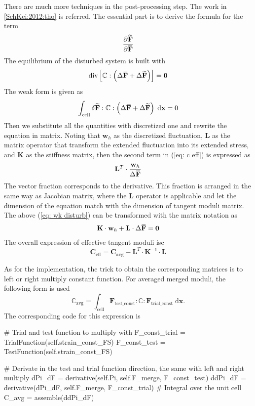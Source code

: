 \documentclass[10pt,a4paper]{scrreprt}
\newcommand{\myd}{\;\mathrm{d}}
\newcommand{\overbar}[1]{\mkern 1.5mu\overline{\mkern-1.5mu#1\mkern-1.5mu}\mkern 1.5mu}
\begin{document}
There are much more techniques in the post-processing step. The work in \ref{SchKei:2012:tho} is referred. The essential part is to derive the formula for the term 
\[
\dfrac{\partial \widetilde{\mathbf{F}}}{\partial \overbar{\mathbf{F}}}
\]
The equilibrium of the disturbed system is built with
\[
\text{div} \left[ \mathbb{C} : \left( \Delta \overbar{\mathbf{F}} + \Delta \widetilde{\mathbf{F}} \right) \right] = \mathbf{0}
\]
The weak form is given as
\begin{equation}
\label{eq: wk disturb}
\int_{\text{cell}} \delta \widetilde{\mathbf{F}} : \mathbb{C} : \left( \Delta \overbar{\mathbf{F}} + \Delta \widetilde{\mathbf{F}} \right) \myd{\mathbf{x}} = 0
\end{equation}
Then we substitute all the quantities with discretized one and rewrite the equation in matrix. Noting that $\mathbf{w}_{h}$ as the discretized fluctuation, $\mathbf{L}$ as the matrix operator that transform the extended fluctuation into its extended stress, and $\mathbf{K}$ as the stiffness matrix, then the second term in (\ref{eq: c eff}) is expressed as
\begin{equation}
\mathbf{L}^{T} \cdot \dfrac{\mathbf{w}_{h}}{\Delta \overbar{\mathbf{F}}} 
\end{equation}
The vector fraction corresponds to the derivative. This fraction is arranged in the same way as Jacobian matrix, where the $\mathbf{L}$ operator is applicable and let the dimension of the equation match with the dimension of tangent moduli matrix. The above (\ref{eq: wk disturb}) can be transformed with the matrix notation as
\begin{equation}
\mathbf{K} \cdot \mathbf{w}_{h} + \mathbf{L} \cdot \Delta \overbar{\mathbf{F}} = \mathbf{0}
\end{equation}
The overall expression of effective tangent moduli isc
\begin{equation}
\mathbf{C}_{\text{eff}} = \mathbf{C}_{\text{avg}} - \mathbf{L}^{T} \cdot \mathbf{K}^{-1} \cdot \mathbf{L}
\end{equation}

As for the implementation, the trick to obtain the corresponding matrices is to left or right multiply constant function. For averaged merged moduli, the following form is used
\begin{equation}
\mathbb{C}_{\text{avg}} = \int_{\text{cell}} \mathbf{F}_{\text{test\_const}}: \mathbb{C} : \mathbf{F}_{\text{trial\_const}} \myd{\mathbf{x}}.
\end{equation}
The corresponding code for this expression is 
\begin{python}
# Trial and test function to multiply with
F_const_trial = TrialFunction(self.strain_const_FS)
F_const_test = TestFunction(self.strain_const_FS)

# Derivate in the test and trial function direction, the same with left and right multiply
dPi_dF = derivative(self.Pi, self.F_merge, F_const_test)
ddPi_dF = derivative(dPi_dF, self.F_merge, F_const_trial)
# Integral over the unit cell
C_avg = assemble(ddPi_dF)
\end{python}
\end{document}
